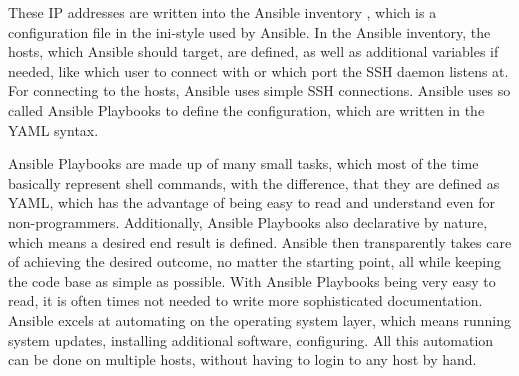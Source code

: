 These IP addresses are written
into the Ansible inventory \cite{ansibleInventoryWebsite}, which is a configuration
file in the ini-style used by Ansible. In the Ansible inventory, the hosts, which 
Ansible should target, are defined, as well as additional variables if needed,
like which user to connect with or which port the SSH daemon listens at.
For connecting to the hosts, Ansible uses simple SSH connections.
Ansible uses so called Ansible Playbooks \cite{ansiblePlaybooksWebsite}
to define the configuration, which are written in the YAML syntax.

Ansible Playbooks are made up of many small tasks, which most of the time basically
represent shell commands, with the difference, that they are defined as YAML,
which has the advantage of being easy to read and understand even for non-programmers.
Additionally, Ansible Playbooks also declarative by nature, which means a desired end result 
is defined. Ansible then transparently takes care of achieving the desired outcome,
no matter the starting point, all while keeping the code base as simple as possible.
With Ansible Playbooks being very easy to read, it is often times not needed to write 
more sophisticated documentation.
Ansible excels at automating on the operating system layer,
which means running system updates, installing additional software,
configuring. All this automation can be done on multiple hosts, without 
having to login to any host by hand. 





